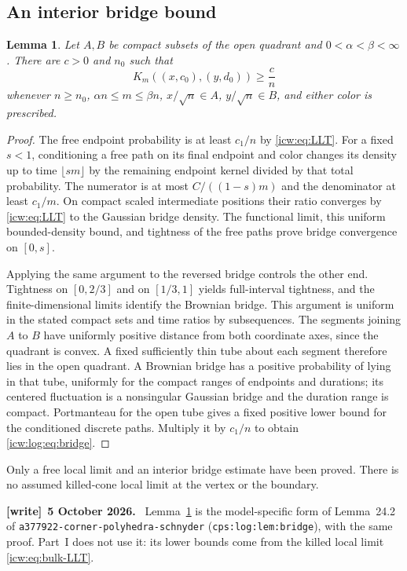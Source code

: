\documentclass[11pt,letterpaper]{article}
\newtheorem{lemma}[theorem]{Lemma}
\theoremstyle{remark}\newtheorem{remark}[theorem]{Remark}
\newcommand{\1}{\mathbf1}
\newenvironment{writenote}[1][]{\par\smallskip\begingroup\small
 \noindent\textbf{[write]}\if\relax\detokenize{#1}\relax\else~\textbf{#1.}\fi\ }%
 {\par\endgroup\smallskip}
\newcommand{\file}[1]{\textup{\nolinkurl{#1}}}
\begin{document}
\subsection{An interior bridge bound}
\begin{lemma}\label{icw:log:lem:bridge}
Let $A,B$ be compact subsets of the open quadrant and
$0<\alpha<\beta<\infty$. There are $c>0$ and $n_0$ such that
\begin{equation}\label{icw:log:eq:bridge}
 K_m((x,c_0),(y,d_0))\ge\frac c n
\end{equation}
whenever $n\ge n_0$, $\alpha n\le m\le\beta n$,
$x/\sqrt n\in A$, $y/\sqrt n\in B$, and either color is prescribed.
\end{lemma}
\begin{proof}
The free endpoint probability is at least $c_1/n$ by
\eqref{icw:eq:LLT}. For a fixed $s<1$, conditioning a free path on its final
endpoint and color changes its density up to time $\lfloor sm\rfloor$
by the remaining endpoint kernel divided by that total probability.
The numerator is at most $C/((1-s)m)$ and the denominator at least
$c_1/m$. On compact scaled intermediate positions their ratio converges
by \eqref{icw:eq:LLT} to the Gaussian bridge density. The functional limit,
this uniform bounded-density bound, and tightness of the free paths
prove bridge convergence on $[0,s]$.

Applying the same argument to the reversed bridge controls the other
end. Tightness on $[0,2/3]$ and on $[1/3,1]$ yields full-interval
tightness, and the finite-dimensional limits identify the Brownian
bridge. This argument is uniform in the stated compact sets and time
ratios by subsequences. The segments joining $A$ to $B$ have uniformly
positive distance from both coordinate axes, since the quadrant is
convex. A fixed sufficiently thin tube about each segment therefore
lies in the open quadrant. A Brownian bridge has a positive probability
of lying in that tube, uniformly for the compact ranges of endpoints
and durations; its centered fluctuation is a nonsingular Gaussian
bridge and the duration range is compact. Portmanteau for the open tube
gives a fixed positive lower bound for the conditioned discrete paths.
Multiply it by $c_1/n$ to obtain \eqref{icw:log:eq:bridge}.
\end{proof}
Only a free local limit and an interior bridge estimate have been proved.
There is no assumed killed-cone local limit at the vertex or the boundary.
\begin{writenote}[5 October 2026]
Lemma~\ref{icw:log:lem:bridge} is the model-specific form of Lemma~24.2 of \file{a377922-corner-polyhedra-schnyder} (\texttt{cps:log:lem:bridge}), with the same proof. Part~I does not use it: its lower bounds come from the killed local limit \eqref{icw:eq:bulk-LLT}.
\end{writenote}
\end{document}

